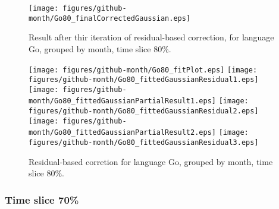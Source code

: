 \begin{figure}[]
\centering
{\texttt{[image: figures/github-month/Go80\_finalCorrectedGaussian.eps]}}
\caption{Result after thir iteration of residual-based correction, for language Go, grouped by month, time slice 80\%.}
\end{figure}


\begin{figure}[hb]
\centering
{}
{\texttt{[image: figures/github-month/Go80\_fitPlot.eps]}}
{\texttt{[image: figures/github-month/Go80\_fittedGaussianResidual1.eps]}}
{\texttt{[image: figures/github-month/Go80\_fittedGaussianPartialResult1.eps]}}
{\texttt{[image: figures/github-month/Go80\_fittedGaussianResidual2.eps]}}
{\texttt{[image: figures/github-month/Go80\_fittedGaussianPartialResult2.eps]}}
{\texttt{[image: figures/github-month/Go80\_fittedGaussianResidual3.eps]}}
\caption{Residual-based corretion for language Go, grouped by month, time slice 80\%.}
\end{figure}


\clearpage 
\newpage 


\FloatBarrier

\subsubsection{Time slice 70\%}

